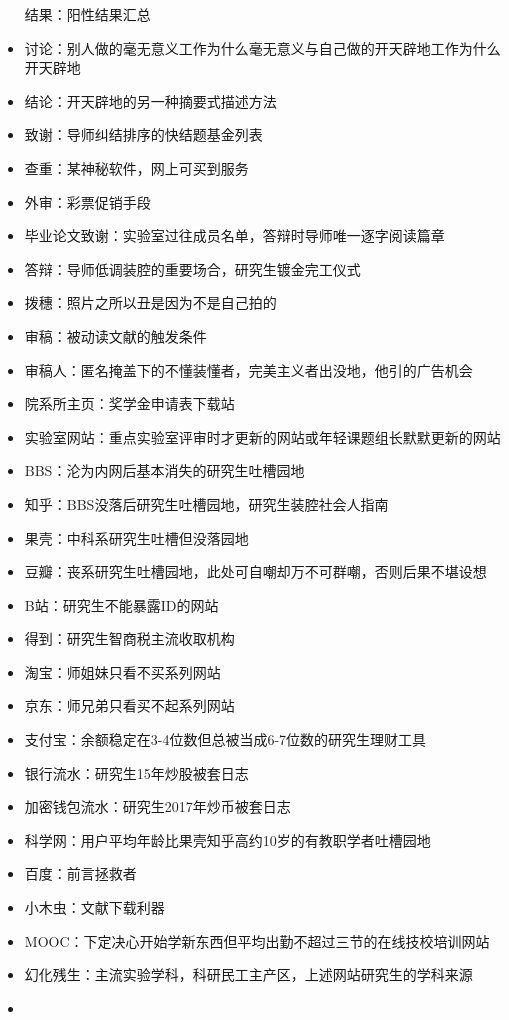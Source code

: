 \documentclass[]{tufte-book}
\begin{document}
\begin{itemize}
  结果：阳性结果汇总
\item
  讨论：别人做的毫无意义工作为什么毫无意义与自己做的开天辟地工作为什么开天辟地
\item
  结论：开天辟地的另一种摘要式描述方法
\item
  致谢：导师纠结排序的快结题基金列表
\item
  查重：某神秘软件，网上可买到服务
\item
  外审：彩票促销手段
\item
  毕业论文致谢：实验室过往成员名单，答辩时导师唯一逐字阅读篇章
\item
  答辩：导师低调装腔的重要场合，研究生镀金完工仪式
\item
  拨穗：照片之所以丑是因为不是自己拍的
\item
  审稿：被动读文献的触发条件
\item
  审稿人：匿名掩盖下的不懂装懂者，完美主义者出没地，他引的广告机会
\item
  院系所主页：奖学金申请表下载站
\item
  实验室网站：重点实验室评审时才更新的网站或年轻课题组长默默更新的网站
\item
  BBS：沦为内网后基本消失的研究生吐槽园地
\item
  知乎：BBS没落后研究生吐槽园地，研究生装腔社会人指南
\item
  果壳：中科系研究生吐槽但没落园地
\item
  豆瓣：丧系研究生吐槽园地，此处可自嘲却万不可群嘲，否则后果不堪设想
\item
  B站：研究生不能暴露ID的网站
\item
  得到：研究生智商税主流收取机构
\item
  淘宝：师姐妹只看不买系列网站
\item
  京东：师兄弟只看买不起系列网站
\item
  支付宝：余额稳定在3-4位数但总被当成6-7位数的研究生理财工具
\item
  银行流水：研究生15年炒股被套日志
\item
  加密钱包流水：研究生2017年炒币被套日志
\item
  科学网：用户平均年龄比果壳知乎高约10岁的有教职学者吐槽园地
\item
  百度：前言拯救者
\item
  小木虫：文献下载利器
\item
  MOOC：下定决心开始学新东西但平均出勤不超过三节的在线技校培训网站
\item
  幻化残生：主流实验学科，科研民工主产区，上述网站研究生的学科来源
\item

\end{itemize}
\end{document}
